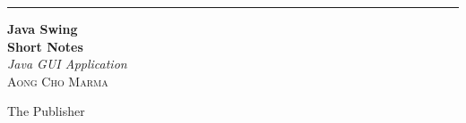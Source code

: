 \documentclass[11pt]{report} %
\newcommand*{\plogo}{\fbox{$\mathcal{PL}$}} %
\begin{document}

\begin{titlepage}
	\raggedleft %
	
	\rule{1pt}{\textheight} %
	\hspace{0.05\textwidth} %
	\parbox[b]{0.75\textwidth}{ %
		
		{\Huge\bfseries Java Swing\\[0.5\baselineskip] Short Notes}\\[2\baselineskip] %
		{\large\textit{Java GUI Application}}\\[4\baselineskip] %
		{\Large\textsc{Aong Cho  Marma}} %
		
		\vspace{0.5\textheight} %
		
		{\noindent The Publisher~~\plogo}\\[\baselineskip] %
	}
\end{titlepage}

	
	\tableofcontents
	\pagenumbering{\roman}	
	
	\patchcmd{\chapter}{\thispagestyle{plain}}{\thispagestyle{fancy}}{}{}
	
	\pagestyle{main} %
	\setcounter{page}{1}
	\renewcommand{\theequation}{\arabic{chapter}.\arabic{equation}}
	
	
	
	
	
	
	
\end{document}
